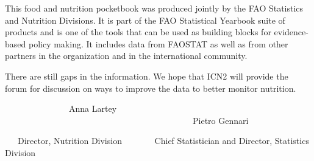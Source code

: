This food and nutrition pocketbook was produced jointly by the FAO Statistics and Nutrition Divisions. It is part of the FAO Statistical Yearbook suite of products and is one of the tools that can be used as building blocks for evidence-based policy making. It includes data from FAOSTAT as well as from other partners in the organization and in the international community. 

There are still gaps in the information. We hope that ICN2 will  provide the  forum for discussion on ways to improve the data to better monitor nutrition.

\bigskip

\ \ \ \ \ \ \ \ \ \ \ \ \ \ \ Anna Lartey \ \ \ \ \ \ \ \ \ \ \ \ \ \ \ \ \ \ \ \ \ \ \ \ \ \ \ \ \ \ \ \ \ \ \ \ \ \ \ \ \ \ \ \ Pietro Gennari

\vspace{-5pt}
\ \ \ Director, Nutrition Division \ \ \ \ \ \ \ Chief Statistician and Director, Statistics Division
